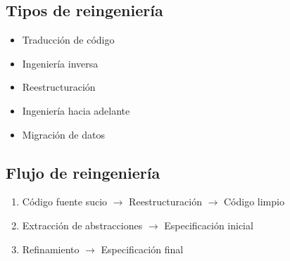 \subsection{Tipos de reingeniería}\label{subsec:tipos-de-reingenieria}
\begin{itemize}
    \item Traducción de código
    \item Ingeniería inversa
    \item Reestructuración
    \item Ingeniería hacia adelante
    \item Migración de datos
\end{itemize}

\subsection{Flujo de reingeniería}\label{subsec:flujo-de-reingenieria}
\begin{enumerate}
    \item Código fuente sucio $\rightarrow$ Reestructuración $\rightarrow$ Código limpio
    \item Extracción de abstracciones $\rightarrow$ Especificación inicial
    \item Refinamiento $\rightarrow$ Especificación final
\end{enumerate}